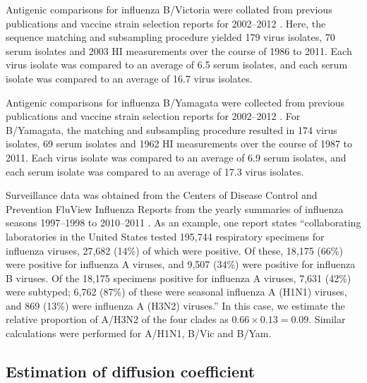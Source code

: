 \documentclass[11pt,oneside,letterpaper]{article}
\begin{document}
Antigenic comparisons for influenza B/Victoria were collated from previous publications \cite{Rota90, Hay01, Muyanga01, Shaw02, Ansaldi04, Puzelli04, Xu04, Barr06, Daum06, Lin07} and vaccine strain selection reports for 2002--2012 \cite{AusWHO06, NIMR02, NIMR03, NIMR04, NIMRFeb05, NIMRSep05, NIMRMarch06, NIMRSep06, NIMRMarch07, NIMRSep07, NIMRMarch08, NIMRFeb09, NIMRSep09, NIMRFeb10, NIMRSep10, NIMRFeb11, NIMRSep11, NIMRFeb12}.
Here, the sequence matching and subsampling procedure yielded 179 virus isolates, 70 serum isolates and 2003 HI measurements over the course of 1986 to 2011.
Each virus isolate was compared to an average of 6.5 serum isolates, and each serum isolate was compared to an average of 16.7 virus isolates.

Antigenic comparisons for influenza B/Yamagata were collected from previous publications \cite{Rota90, Kanegae90, Nakajima92, Nerome98, Hay01, Muyanga01, Nakagawa02, Abed03, Ansaldi03, Ansaldi04, Matsuzaki04, Puzelli04, Shaw02, Xu04, Barr06, Daum06, Lin07} and vaccine strain selection reports for 2002--2012 \cite{AusWHO06, NIMR02, NIMR03, NIMR04, NIMRFeb05, NIMRSep05, NIMRMarch06, NIMRSep06, NIMRMarch07, NIMRSep07, NIMRMarch08, NIMRFeb09, NIMRSep09, NIMRFeb10, NIMRSep10, NIMRFeb11, NIMRSep11, NIMRFeb12}.
For B/Yamagata, the matching and subsampling procedure resulted in 174 virus isolates, 69 serum isolates and 1962 HI measurements over the course of 1987 to 2011.
Each virus isolate was compared to an average of 6.9 serum isolates, and each serum isolate was compared to an average of 17.3 virus isolates.

Surveillance data was obtained from the Centers of Disease Control and Prevention FluView Influenza Reports from the yearly summaries of influenza seasons 1997--1998 to 2010--2011 \cite{CDCReports}.
As an example, one report states ``collaborating laboratories in the United States tested 195,744 respiratory specimens for influenza viruses, 27,682 (14\%) of which were positive. Of these, 18,175 (66\%) were positive for influenza A viruses, and 9,507 (34\%) were positive for influenza B viruses. Of the 18,175 specimens positive for influenza A viruses, 7,631 (42\%) were subtyped; 6,762 (87\%) of these were seasonal influenza A (H1N1) viruses, and 869 (13\%) were influenza A (H3N2) viruses.''
In this case, we estimate the relative proportion of A/H3N2 of the four clades as $0.66 \times 0.13 = 0.09$.
Similar calculations were performed for A/H1N1, B/Vic and B/Yam.

\subsection*{Estimation of diffusion coefficient}
\end{document}
